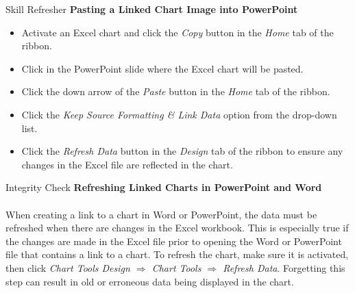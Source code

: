 \begin{center}
	\begin{sklbox}{Skill Refresher}
		\textbf{Pasting a Linked Chart Image into PowerPoint}
		\\
		\begin{itemize}
			\setlength{\itemsep}{0pt}
			\setlength{\parskip}{0pt}
			\setlength{\parsep}{0pt}
			
			\item Activate an Excel chart and click the \textit{Copy} button in the \textit{Home} tab of the ribbon.
			\item Click in the PowerPoint slide where the Excel chart will be pasted.
			\item Click the down arrow of the \textit{Paste} button in the \textit{Home} tab of the ribbon.
			\item Click the \textit{Keep Source Formatting \& Link Data} option from the drop-down list.
			\item Click the \textit{Refresh Data} button in the \textit{Design} tab of the ribbon to ensure any changes in the Excel file are reflected in the chart.
			
		\end{itemize}
	\end{sklbox}
\end{center}

\begin{center}
	\begin{infobox}{Integrity Check}
		\textbf{Refreshing Linked Charts in PowerPoint and Word}
		\\
		\\
		When creating a link to a chart in Word or PowerPoint, the data must be refreshed when there are changes in the Excel workbook. This is especially true if the changes are made in the Excel file prior to opening the Word or PowerPoint file that contains a link to a chart. To refresh the chart, make sure it is activated, then click \textit{Chart Tools Design $ \Rightarrow $ Chart Tools $ \Rightarrow $ Refresh Data}. Forgetting this step can result in old or erroneous data being displayed in the chart.
	\end{infobox}
\end{center}

